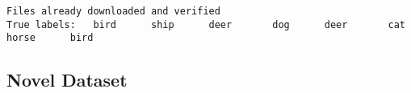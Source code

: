 \documentclass[11pt]{article}
\begin{document}
    \begin{Verbatim}[commandchars=\\\{\},fontsize=\footnotesize]
Files already downloaded and verified
True labels:   bird      ship      deer       dog      deer       cat     horse      bird

    \end{Verbatim}

    \begin{center}
    \end{center}
    
    \subsection*{Novel Dataset}\label{novel-dataset}
\end{document}

